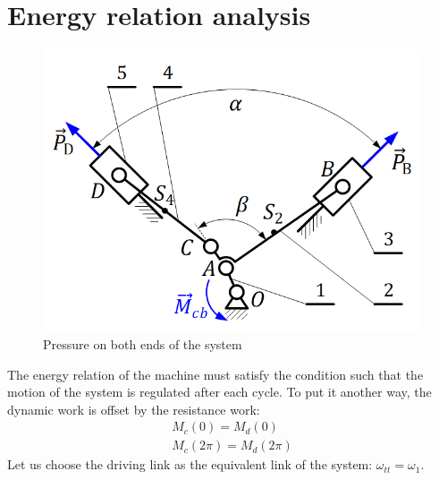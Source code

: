 \section{Energy relation analysis}
\begin{figure}[h]
	\centering
	\includegraphics{12}
	\caption{Pressure on both ends of the system}
	\label{fig:12}
\end{figure}
The energy relation of the machine must satisfy the condition such that the motion of the system is regulated after each cycle. To put it another way, the dynamic work is offset by the resistance work: 
\begin{equation}\label{condition}
	\begin{array}{c}
	M_{c}(0)=M_{d}(0)\\
	M_{c}(2\pi)=M_{d}(2\pi)
	\end{array}
\end{equation}
Let us choose the driving link as the equivalent link of the system: $ \omega_{tt}=\omega_1 $.
